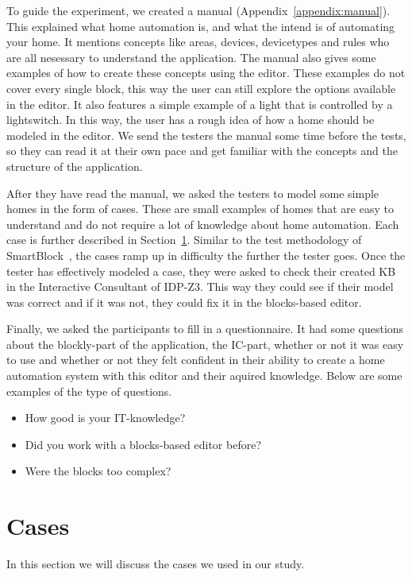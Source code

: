 \documentclass[11pt,a4paper]{report}
\begin{document}
To guide the experiment, we created a manual (Appendix~\ref{appendix:manual}). This explained what home automation is, and what the intend is of automating your home. It mentions concepts like areas, devices, devicetypes and rules who are all nesessary to understand the application. The manual also gives some examples of how to create these concepts using the editor. These examples do not cover every single block, this way the user can still explore the options available in the editor. It also features a simple example of a light that is controlled by a lightswitch. In this way, the user has a rough idea of how a home should be modeled in the editor. We send the testers the manual some time before the tests, so they can read it at their own pace and get familiar with the concepts and the structure of the application.

After they have read the manual, we asked the testers to model some simple homes in the form of cases. These are small examples of homes that are easy to understand and do not require a lot of knowledge about home automation. Each case is further described in Section~\ref{cases}. Similar to the test methodology of SmartBlock~\cite{SOTA_SmartBlock}, the cases ramp up in difficulty the further the tester goes. Once the tester has effectively modeled a case, they were asked to check their created KB in the Interactive Consultant of IDP-Z3. This way they could see if their model was correct and if it was not, they could fix it in the blocks-based editor.

Finally, we asked the participants to fill in a questionnaire. It had some questions about the blockly-part of the application, the IC-part, whether or not it was easy to use and whether or not they felt confident in their ability to create a home automation system with this editor and their aquired knowledge. Below are some examples of the type of questions.
\begin{itemize}
    \item How good is your IT-knowledge?
    \item Did you work with a blocks-based editor before?
    \item Were the blocks too complex?
\end{itemize}

\section{Cases}
\label{cases}
In this section we will discuss the cases we used in our study.
\end{document}
